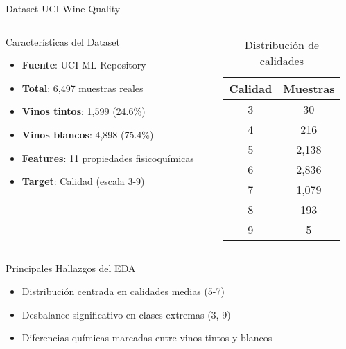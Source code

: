 \documentclass[aspectratio=169]{beamer}
\begin{document}
\begin{frame}{Dataset UCI Wine Quality}
    \begin{columns}[T]
        \begin{column}{0.6\textwidth}
            \begin{block}{Características del Dataset}
                \begin{itemize}
                    \item \textbf{Fuente}: UCI ML Repository
                    \item \textbf{Total}: 6,497 muestras reales
                    \item \textbf{Vinos tintos}: 1,599 (24.6\%)
                    \item \textbf{Vinos blancos}: 4,898 (75.4\%)
                    \item \textbf{Features}: 11 propiedades fisicoquímicas
                    \item \textbf{Target}: Calidad (escala 3-9)
                \end{itemize}
            \end{block}
        \end{column}
        
        \begin{column}{0.35\textwidth}
            \begin{table}
                \centering
                \small
                \begin{tabular}{cc}
                    \toprule
                    \textbf{Calidad} & \textbf{Muestras} \\
                    \midrule
                    3 & 30 \\
                    4 & 216 \\
                    5 & 2,138 \\
                    6 & 2,836 \\
                    7 & 1,079 \\
                    8 & 193 \\
                    9 & 5 \\
                    \bottomrule
                \end{tabular}
                \caption{Distribución de calidades}
            \end{table}
        \end{column}
    \end{columns}
    
    \vspace{0.3cm}
    
    \begin{exampleblock}{Principales Hallazgos del EDA}
        \begin{itemize}
            \item Distribución centrada en calidades medias (5-7)
            \item Desbalance significativo en clases extremas (3, 9)
            \item Diferencias químicas marcadas entre vinos tintos y blancos
        \end{itemize}
    \end{exampleblock}
\end{frame}
\end{document}
